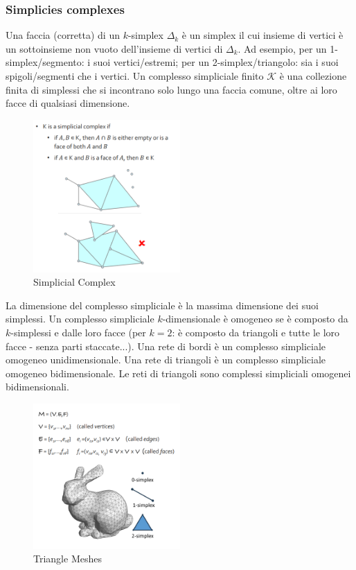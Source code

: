 \subsubsection{Simplicies complexes}
Una faccia (corretta) di un $k$-simplex $\Delta_k$ è un simplex il cui insieme di vertici è un sottoinsieme non vuoto dell'insieme di vertici di $\Delta_k$. Ad esempio, per un 1-simplex/segmento: i suoi vertici/estremi; 
per un 2-simplex/triangolo: sia i suoi spigoli/segmenti che i vertici.
Un complesso simpliciale finito $\mathcal{K}$ è una collezione finita di simplessi che si incontrano solo lungo una faccia comune, oltre ai loro facce di qualsiasi dimensione.
\begin{figure}[H]
    \centering
    \includegraphics[width=0.5\textwidth]{images/SimpComp.png} 
    \caption{Simplicial Complex}
    \label{fig:immagine}
\end{figure}
La dimensione del complesso simpliciale è la massima dimensione dei suoi simplessi. Un complesso simpliciale $k$-dimensionale è omogeneo se è composto da $k$-simplessi e dalle loro facce (per $k = 2$: è composto da triangoli e tutte le loro facce - senza parti staccate...).
Una rete di bordi è un complesso simpliciale omogeneo unidimensionale.
Una rete di triangoli è un complesso simpliciale omogeneo bidimensionale.
Le reti di triangoli sono complessi simpliciali omogenei bidimensionali.
\begin{figure}[H]
    \centering
    \includegraphics[width=0.5\textwidth]{images/trMesh.png} 
    \caption{Triangle Meshes}
    \label{fig:immagine}
\end{figure}
